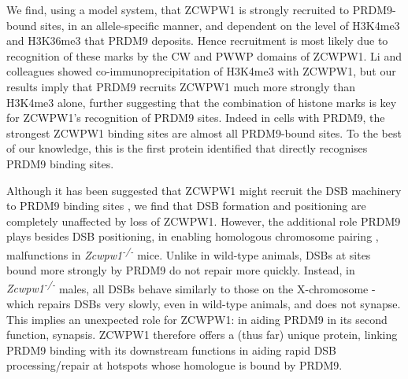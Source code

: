 We find, using a model system, that ZCWPW1 is strongly recruited to PRDM9-bound sites, in an allele-specific manner, and dependent on the level of H3K4me3 and H3K36me3 that PRDM9 deposits.
Hence recruitment is most likely due to recognition of these marks by the CW and PWWP domains of ZCWPW1.
Li and colleagues \parencite{Li2019histone} showed co-immunoprecipitation of H3K4me3 with ZCWPW1, but our results imply that PRDM9 recruits ZCWPW1 much more strongly than H3K4me3 alone, further suggesting that the combination of histone marks is key for ZCWPW1's recognition of PRDM9 sites.
Indeed in cells with PRDM9, the strongest ZCWPW1 binding sites are almost all PRDM9-bound sites.
To the best of our knowledge, this is the first protein identified that directly recognises PRDM9 binding sites.

Although it has been suggested that ZCWPW1 might recruit the DSB machinery to PRDM9 binding sites \parencite{Li2019histone, Spruce2019HELLS}, we find that DSB formation and positioning are completely unaffected by loss of ZCWPW1.
However, the additional role PRDM9 plays besides DSB positioning, in enabling homologous chromosome pairing \parencite{Davies2016Reengineering}, malfunctions in \textit{Zcwpw1\textsuperscript{-/-}} mice.
Unlike in wild-type animals, DSBs at sites bound more strongly by PRDM9 do not repair more quickly.
Instead, in \textit{Zcwpw1\textsuperscript{-/-}} males, all DSBs behave similarly to those on the X-chromosome - which repairs DSBs very slowly, even in wild-type animals, and does not synapse.
This implies an unexpected role for ZCWPW1: in aiding PRDM9 in its second function, synapsis.
ZCWPW1 therefore offers a (thus far) unique protein, linking PRDM9 binding with its downstream functions \parencite{Davies2016Reengineering, Hinch2019Factors, Li2019highresolution} in aiding rapid DSB processing/repair at hotspots whose homologue is bound by PRDM9.

